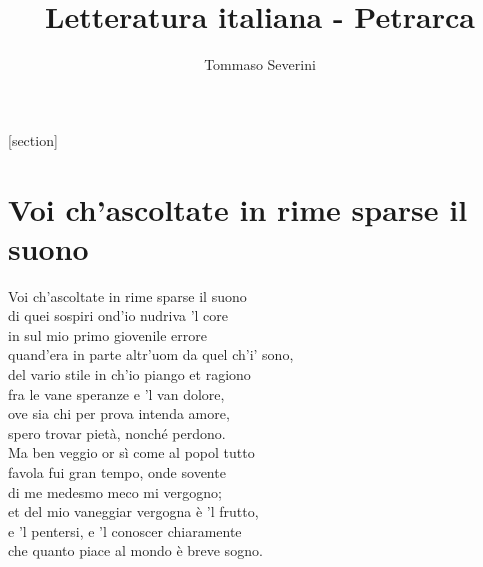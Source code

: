 \documentclass[10pt,a4paper]{article}
\author{Tommaso Severini}
\title{Letteratura italiana - Petrarca}
\begin{document}
	\maketitle
	
	\tableofcontents
	
	[section]
	
	\section[Domanda 1]{Voi ch'ascoltate in rime sparse il suono}
	
	\begin{estratto}
		Voi ch’ascoltate in rime sparse il suono\\
		di quei sospiri ond’io nudriva ’l core\\
		in sul mio primo giovenile errore\\
		quand’era in parte altr’uom da quel ch’i’ sono,\\
		
		del vario stile in ch’io piango et ragiono\\
		fra le vane speranze e ’l van dolore,\\
		ove sia chi per prova intenda amore,\\
		spero trovar pietà, nonché perdono.\\
		
		Ma ben veggio or sì come al popol tutto\\
		favola fui gran tempo, onde sovente\\
		di me medesmo meco mi vergogno;\\
		
		et del mio vaneggiar vergogna è ’l frutto,\\
		e ’l pentersi, e ’l conoscer chiaramente\\
		che quanto piace al mondo è breve sogno.\\
	\end{estratto}
\end{document}
